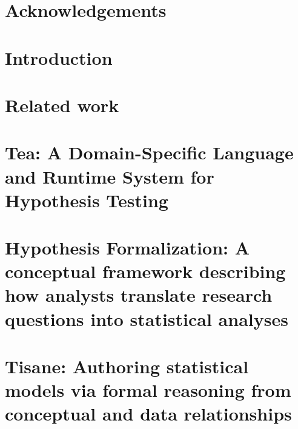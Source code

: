 \documentclass[11pt]{book}
\begin{document}
% 





{} %



\chapter*{Acknowledgements}



\tableofcontents{}
\listoffigures
\listoftables
\clearpage

\chapter {Introduction}


\chapter {Related work}
\label{chapter:relatedWork}


\chapter{Tea: A Domain-Specific Language and Runtime System for Hypothesis Testing} %
\label{chapter:tea}


\chapter{Hypothesis Formalization: A conceptual framework describing how analysts translate research questions into statistical analyses} %
\label{chapter:hypoForm}


\chapter{Tisane: Authoring statistical models via formal reasoning from conceptual and data relationships}
\label{chapter:tisane}


% 
\end{document}
